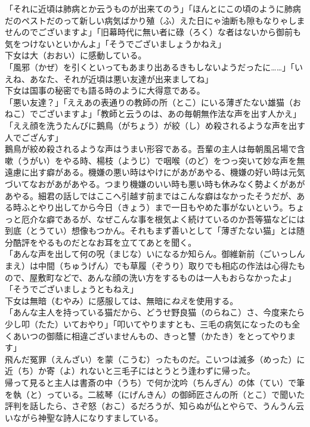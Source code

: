 \documentclass{book}
\begin{document}
「それに近頃は肺病とか云うものが出来てのう」「ほんとにこの頃のように肺病だのペストだのって新しい病気ばかり殖（ふ）えた日にゃ油断も隙もなりゃしませんのでございますよ」「旧幕時代に無い者に碌（ろく）な者はないから御前も気をつけないといかんよ」「そうでございましょうかねえ」\\
下女は大（おおい）に感動している。\\
「風邪（かぜ）を引くといってもあまり出あるきもしないようだったに\ldots{}\ldots{}」「いえね、あなた、それが近頃は悪い友達が出来ましてね」\\
下女は国事の秘密でも語る時のように大得意である。\\
「悪い友達？」「ええあの表通りの教師の所（とこ）にいる薄ぎたない雄猫（おねこ）でございますよ」「教師と云うのは、あの毎朝無作法な声を出す人かえ」「ええ顔を洗うたんびに鵝鳥（がちょう）が絞（し）め殺されるような声を出す人でござんす」\\
鵝鳥が絞め殺されるような声はうまい形容である。吾輩の主人は毎朝風呂場で含嗽（うがい）をやる時、楊枝（ようじ）で咽喉（のど）をつっ突いて妙な声を無遠慮に出す癖がある。機嫌の悪い時はやけにがあがあやる、機嫌の好い時は元気づいてなおがあがあやる。つまり機嫌のいい時も悪い時も休みなく勢よくがあがあやる。細君の話しではここへ引越す前まではこんな癖はなかったそうだが、ある時ふとやり出してから今日（きょう）まで一日もやめた事がないという。ちょっと厄介な癖であるが、なぜこんな事を根気よく続けているのか吾等猫などには到底（とうてい）想像もつかん。それもまず善いとして「薄ぎたない猫」とは随分酷評をやるものだとなお耳を立ててあとを聞く。\\
「あんな声を出して何の呪（まじな）いになるか知らん。御維新前（ごいっしんまえ）は中間（ちゅうげん）でも草履（ぞうり）取りでも相応の作法は心得たもので、屋敷町などで、あんな顔の洗い方をするものは一人もおらなかったよ」「そうでございましょうともねえ」\\
下女は無暗（むやみ）に感服しては、無暗に\emph{ねえ}を使用する。\\
「あんな主人を持っている猫だから、どうせ野良猫（のらねこ）さ、今度来たら少し叩（たた）いておやり」「叩いてやりますとも、三毛の病気になったのも全くあいつの御蔭に相違ございませんもの、きっと讐（かたき）をとってやります」\\
飛んだ冤罪（えんざい）を蒙（こうむ）ったものだ。こいつは滅多（めった）に近（ち）か寄（よ）れないと三毛子にはとうとう逢わずに帰った。\\
帰って見ると主人は書斎の中（うち）で何か沈吟（ちんぎん）の体（てい）で筆を執（と）っている。二絃琴（にげんきん）の御師匠さんの所（とこ）で聞いた評判を話したら、さぞ怒（おこ）るだろうが、知らぬが仏とやらで、うんうん云いながら神聖な詩人になりすましている。\\
\end{document}
